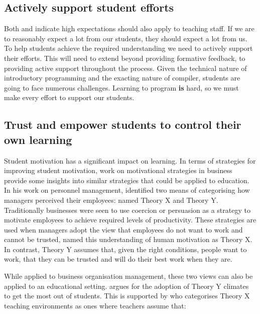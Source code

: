 
\subsection{Actively support student efforts} %
\label{ssub:actively_support_student_efforts}

Both \citet{Chickering:1987} and \citet{Soetanto:2003,Soetanto:2012} indicate high expectations should also apply to teaching staff. If we are to reasonably expect a lot from our students, they should expect a lot from us. To help students achieve the required understanding we need to actively support their efforts. This will need to extend beyond providing formative feedback, to providing active support throughout the process. Given the technical nature of introductory programming and the exacting nature of compiler, students are going to face numerous challenges. Learning to program \textbf{is} hard, so we must make every effort to support our students.


\subsection{Trust and empower students to control their own learning} %
\label{ssub:trust_and_empower_students_to_control_their_own_learning}

Student motivation has a significant impact on learning. In terms of strategies for improving student motivation, \citet{McGregor:1960} work on motivational strategies in business provide some insights into similar strategies that could be applied to education.  In his work on personnel management, \citet{McGregor:1960} identified two means of categorising how managers perceived their employees: named Theory X and Theory Y. Traditionally businesses were seen to use coercion or persuasion as a strategy to motivate employees to achieve required levels of productivity. These strategies are used when managers adopt the view that employees do not want to work and cannot be trusted, \citet{McGregor:1960} named this understanding of human motivation as Theory X. In contrast, Theory Y assumes that, given the right conditions, people want to work, that they can be trusted and will do their best work when they are.

While applied to business organisation management, these two views can also be applied to an educational setting. \citet{Biggs:2007} argues for the adoption of Theory Y climates to get the most out of students. This is supported by \citet{Markwell:2004} who categorises Theory X teaching environments as ones where teachers assume that:

